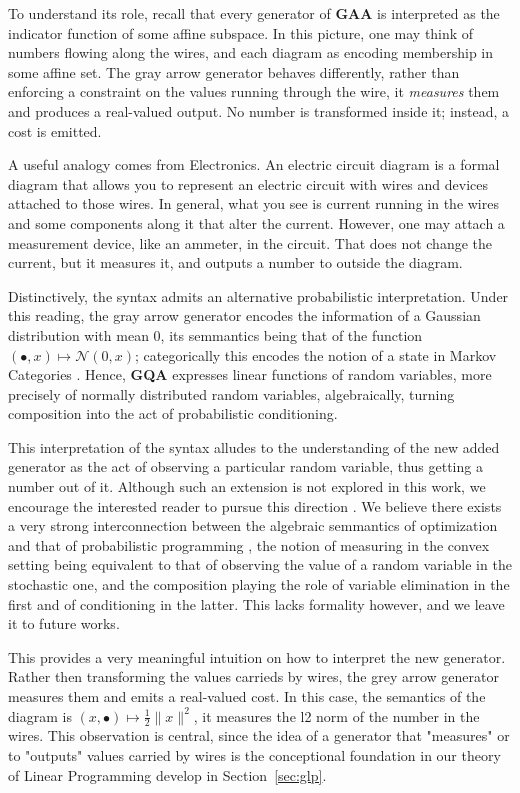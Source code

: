 To understand its role, recall that every generator of $\mathbf{GAA}$ is  interpreted
as the indicator function of some affine subspace. In this  picture, one may think of
numbers flowing along the wires, and each diagram  as encoding membership in some affine set.
The gray arrow  generator behaves differently, rather than enforcing a constraint on the
values running through the wire, it \emph{measures} them and produces a  real-valued output.
No number is transformed inside it; instead, a cost is  emitted.

A useful analogy comes from Electronics.
An electric circuit diagram is a formal diagram that allows you to represent an electric
circuit with wires and devices attached to those wires. In general,
what you see is current running in the wires and some components along it that alter the current. However,
one may attach a measurement device, like an ammeter, in the circuit.
That does not change the current, but it measures it, and outputs a number to outside the diagram.

Distinctively, the syntax admits an alternative probabilistic interpretation.
Under this reading, the gray arrow generator encodes the information of a Gaussian distribution
with mean 0,
its semmantics being that of the function $(\bullet, x)  \mapsto \mathcal{N}(0,x)$; categorically
this encodes the notion of a state in Markov Categories \cite{stein2023gaussian,Cho_2019, fritz2020synthetic}. Hence, \textbf{GQA}
expresses linear functions of random variables, more precisely of normally distributed random variables,
algebraically, turning composition into the act of probabilistic conditioning.

This interpretation of the syntax alludes to the understanding of the new added
generator as the act of observing a particular random variable, thus getting a number out of it.
Although such an extension is not explored in this work, we encourage the interested reader to pursue this
direction \cite{stein2024gqa,stein2025compositional}. We believe there exists a very strong interconnection between
the algebraic semmantics of optimization and that of probabilistic programming \cite{stein2024compositional}, the notion
of measuring in the convex setting being equivalent to that of observing the value of a random variable
in the stochastic one, and the composition playing the role of variable elimination in the first and
of conditioning in the latter. This lacks formality however, and we leave it to future works.

This provides a very meaningful intuition on how to interpret the new generator.
Rather then transforming the values carrieds by wires, the grey arrow generator measures
them and emits a real-valued cost. In this case,
the semantics of the diagram is $(x, \bullet) \mapsto \frac{1}{2}\|x\|^2$,
it measures the l2 norm of the number in the wires. This observation is central, since
the idea of a generator that "measures" or to "outputs" values carried by wires
is the conceptional foundation in our theory of Linear Programming develop in Section~\ref{sec:glp}.

